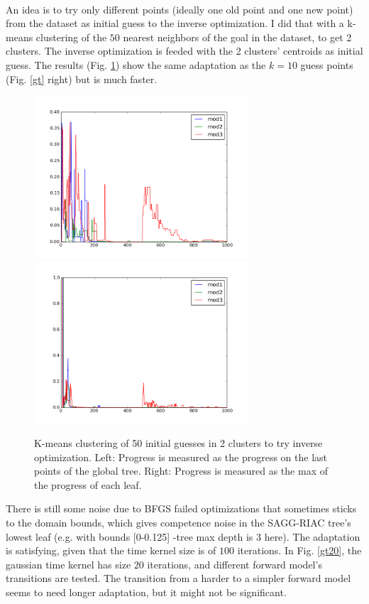 \documentclass[12pt]{article}
\begin{document}
		\paragraph{}
		An idea is to try only different points (ideally one old point and one new point) from the dataset as initial guess to the inverse optimization.
		I did that with a k-means clustering of the $50$ nearest neighbors of the goal in the dataset, to get 2 clusters. The inverse optimization is feeded with the 2 clusters' centroids as initial guess.
		The results (Fig. \ref{kmeans}) show the same adaptation as the $k=10$ guess points (Fig. \ref{gt} right) but is much faster.		
		
		
		\begin{figure}[H]
			\centering
			\includegraphics[width=8cm]{./include/NSLWLR-kmeans2-k=50_max_prog.png}
			\includegraphics[width=8cm]{./include/NSLWLR-kmeans2-k=50_all_prog.png}
			\caption{K-means clustering of 50 initial guesses in 2 clusters to try inverse optimization. Left: Progress is measured as the progress on the last points of the global tree. Right: Progress is measured as the max of the progress of each leaf.}
			\label{kmeans}
		\end{figure}
		
		There is still some noise due to BFGS failed optimizations that sometimes sticks to the domain bounds, which gives competence noise in the SAGG-RIAC tree's lowest leaf (e.g. with bounds [0-0.125] -tree max depth is $3$ here).
		The adaptation is satisfying, given that the time kernel size is of $100$ iterations. In Fig. \ref{gt20}, the gaussian time kernel has size $20$ iterations, and different forward model's transitions are tested.
		The transition from a harder to a simpler forward model seems to need longer adaptation, but it might not be significant.
		
\end{document}
